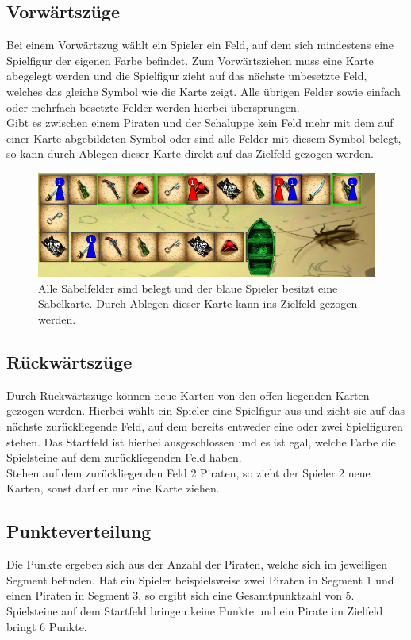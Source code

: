 \documentclass[a4paper, ngerman]{scrartcl}
\begin{document}
	\subsection{Vorwärtszüge}
	Bei einem Vorwärtszug wählt ein Spieler ein Feld, auf dem sich mindestens eine 
	Spiel\-figur der eigenen Farbe befindet. Zum Vorwärtsziehen muss eine Karte
	abegelegt werden und die Spielfigur zieht auf das nächste unbesetzte Feld,
	welches das gleiche Symbol wie die Karte zeigt. Alle übrigen Felder sowie
	einfach oder mehrfach besetzte Felder werden hierbei übersprungen.\\
	Gibt es zwischen einem Piraten und der Schaluppe kein Feld mehr mit dem auf
	einer Karte abgebildeten Symbol oder sind alle Felder mit diesem Symbol
	belegt, so kann durch Ablegen dieser Karte direkt auf das Zielfeld gezogen
	werden.
	\begin{figure}[h]
		\centering
		\label{fig:Zielfeld}
		\includegraphics[scale = 0.5]{bilder/zielfeld}
		\caption{Alle Säbelfelder sind belegt und der blaue Spieler besitzt eine
		Säbelkarte.
		Durch Ablegen dieser Karte kann ins Zielfeld gezogen werden.}
	\end{figure}
	
	\subsection{Rückwärtszüge}
	Durch Rückwärtszüge können neue Karten von den offen liegenden Karten
	gezogen werden.
	Hierbei wählt ein Spieler eine Spielfigur aus und zieht sie auf das nächste
	zurückliegende Feld, auf dem bereits entweder eine oder zwei Spielfiguren
	stehen. Das Startfeld ist hierbei ausgeschlossen und es ist egal, welche Farbe
	die Spielsteine auf dem zurückliegenden Feld haben.\\
	Stehen auf dem zurückliegenden Feld 2 Piraten, so zieht der Spieler 2 neue
	Karten, sonst darf er nur eine Karte ziehen.
	
	\subsection{Punkteverteilung}
	Die Punkte ergeben sich aus der Anzahl der Piraten, welche sich im jeweiligen
	Segment befinden. Hat ein Spieler beispielsweise zwei Piraten in Segment 1 und
	einen Piraten in Segment 3, so ergibt sich eine Gesamtpunktzahl von 5.\\
	Spielsteine auf dem Startfeld bringen keine Punkte und ein Pirate im Zielfeld
	bringt 6 Punkte.
	
\end{document}
